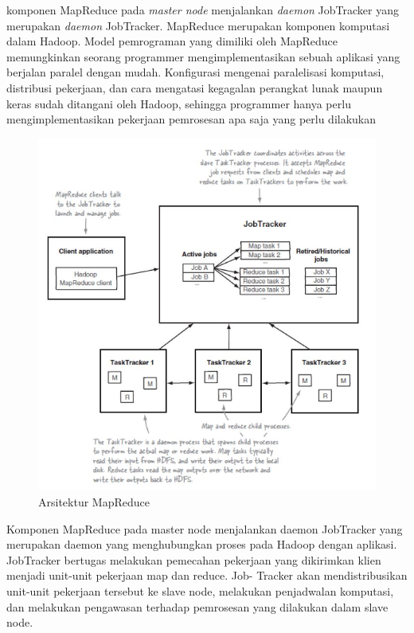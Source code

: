 \documentclass[a4paper,twoside]{article}
\begin{document}
\begin{enumerate}
{\begin{itemize}
{		komponen MapReduce pada \textit{master node} menjalankan \textit{daemon} JobTracker 					yang merupakan \textit{daemon} JobTracker. MapReduce merupakan komponen komputasi dalam 				Hadoop. Model pemrograman yang dimiliki
		oleh MapReduce memungkinkan seorang programmer mengimplementasikan sebuah aplikasi yang
		berjalan paralel dengan mudah. Konfigurasi mengenai paralelisasi komputasi, distribusi 					pekerjaan, dan cara mengatasi kegagalan perangkat lunak maupun keras sudah ditangani oleh 				Hadoop, sehingga programmer hanya perlu mengimplementasikan pekerjaan pemrosesan apa saja 				yang perlu dilakukan
	
		\begin{figure}[H] 
		\centering  
		\includegraphics[scale=0.5]{mapreducearchitecture}  
		\caption[Gambar Arsitektur MapReduce]{Arsitektur MapReduce} 
		\label{fig:HDFS Architecture} 
		\end{figure}
		\newpage
		Komponen MapReduce pada master node menjalankan daemon JobTracker yang merupakan
		daemon yang menghubungkan proses pada Hadoop dengan aplikasi. JobTracker bertugas melakukan
		pemecahan pekerjaan yang dikirimkan klien menjadi unit-unit pekerjaan map dan reduce. Job-
		Tracker akan mendistribusikan unit-unit pekerjaan tersebut ke slave node, melakukan 					penjadwalan komputasi, dan melakukan pengawasan terhadap pemrosesan yang dilakukan dalam 				slave node.
}
\end{itemize}}
\end{enumerate}
\end{document}
